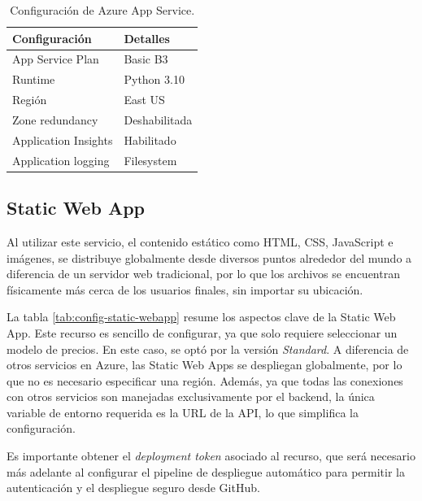 \begin{table}[h]
	\centering
	\caption[Configuración de Azure App Service]{Configuración de Azure App Service.}
	\begin{tabular}{l l}    
		\toprule
		\textbf{Configuración} & \textbf{Detalles} 	\\
		\midrule
		App Service Plan       & Basic B3           \\
		Runtime                & Python 3.10        \\
		Región                 & East US 			\\		
		Zone redundancy        & Deshabilitada		\\
		Application Insights   & Habilitado         \\
		Application logging	   & Filesystem			\\
		\bottomrule
		\hline
	\end{tabular}
	\label{tab:config-app-service}
\end{table}

\subsection{Static Web App}

Al utilizar este servicio, el contenido estático como HTML, CSS, JavaScript e imágenes, se distribuye globalmente desde diversos puntos 
alrededor del mundo a diferencia de un servidor web tradicional, por lo que los archivos se encuentran físicamente más cerca de los usuarios finales,
sin importar su ubicación.

La tabla \ref{tab:config-static-webapp} resume los aspectos clave de la Static Web App. Este recurso es sencillo de configurar, ya que solo requiere seleccionar un modelo de precios. En este caso, se optó por 
la versión \textit{Standard}. A diferencia de otros servicios en Azure, las Static Web Apps se despliegan globalmente, por lo que no es necesario especificar una región. 
Además, ya que todas las conexiones con otros servicios son manejadas exclusivamente por el backend, la única variable de entorno requerida 
es la URL de la API, lo que simplifica la configuración.

Es importante obtener el \textit{deployment token} asociado al recurso, que será necesario más adelante al configurar el pipeline de despliegue automático 
para permitir la autenticación y el despliegue seguro desde GitHub.

